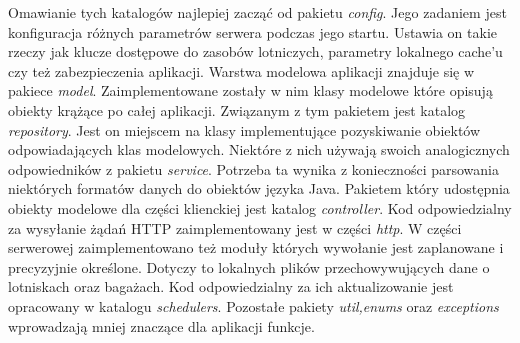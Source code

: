 \documentclass[12pt, twoside]{report}
\begin{document}
Omawianie tych katalogów najlepiej zacząć od pakietu \textit{config}. Jego zadaniem jest konfiguracja różnych parametrów serwera podczas jego startu. Ustawia on takie rzeczy jak klucze dostępowe do zasobów lotniczych, parametry lokalnego cache'u czy też zabezpieczenia aplikacji. Warstwa modelowa aplikacji znajduje się w pakiece \textit{model}. Zaimplementowane zostały w nim klasy modelowe które opisują obiekty krążące po całej aplikacji. Związanym z tym pakietem jest katalog \textit{repository}. Jest on miejscem na klasy implementujące pozyskiwanie obiektów odpowiadających klas modelowych. Niektóre z nich używają swoich analogicznych odpowiedników z pakietu \textit{service}. Potrzeba ta wynika z konieczności parsowania niektórych formatów danych do obiektów języka Java. Pakietem który udostępnia obiekty modelowe dla części klienckiej jest katalog \textit{controller}. Kod odpowiedzialny za wysyłanie żądań HTTP zaimplementowany jest w części \textit{http}. W części serwerowej zaimplementowano też moduły których wywołanie jest zaplanowane i precyzyjnie określone. Dotyczy to lokalnych plików przechowywujących dane o lotniskach oraz bagażach. Kod odpowiedzialny za ich aktualizowanie jest opracowany w katalogu \textit{schedulers}. Pozostałe pakiety \textit{util,enums} oraz \textit{exceptions} wprowadzają mniej znaczące dla aplikacji funkcje.  
\end{document}
